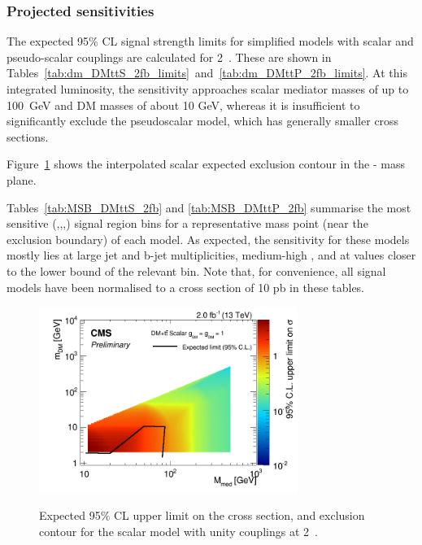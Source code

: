 \clearpage 

 
\clearpage


\subsubsection{Projected sensitivities}

The expected 95\% CL signal strength limits for simplified \DMtt models with scalar and
pseudo-scalar couplings are calculated for 2~\ifb. These are shown in
Tables~\ref{tab:dm_DMttS_2fb_limits}~and~\ref{tab:dm_DMttP_2fb_limits}. At this
integrated luminosity, the sensitivity approaches scalar mediator masses of up 
to 100~GeV and DM masses of about 10 GeV, whereas it is insufficient to
significantly exclude the pseudoscalar model, which has generally smaller cross
sections.

Figure~\ref{fig:dm_DMttS_2fb_2dlimits} shows the interpolated scalar expected 
exclusion contour in the {\mphi-\mchi} mass plane.

Tables~\ref{tab:MSB_DMttS_2fb} and \ref{tab:MSB_DMttP_2fb} summarise the most sensitive 
{(\njet,\nb,\scalht,\mht)} signal region
bins for a representative mass point (near the exclusion boundary) of each \DMtt
model. As expected, the sensitivity for these models mostly lies at large jet and b-jet
multiplicities, medium-high \scalht, and at \mht values closer to the lower bound
of the relevant \scalht bin. Note that, for convenience, all signal models have
been normalised to a cross section of 10 pb in these tables.


\clearpage


\clearpage

\begin{figure}
\begin{center}
\includegraphics[width=0.75\textwidth]{figures/DMplots/dm_DMttS_2p0fb_2dlimits.png} \\
\caption{Expected 95\% CL upper limit on the cross section, and exclusion
contour for the scalar \DMtt model with unity couplings at 2~\ifb.}
\label{fig:dm_DMttS_2fb_2dlimits}
\end{center}
\end{figure}

